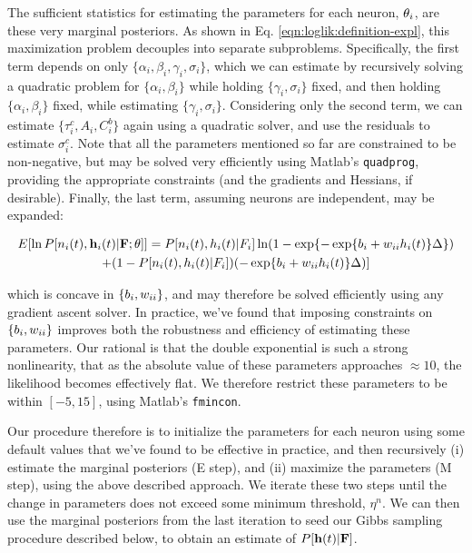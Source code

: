 The sufficient statistics for estimating the parameters for each neuron, $\mathbf{\theta}_i$, are these very marginal posteriors.  As shown in Eq. \eqref{eqn:loglik:definition-expl}, this maximization problem decouples into separate subproblems.  Specifically, the first term depends on only $\{\alpha_i, \beta_i, \gamma_i, \sigma_i\}$, which we can estimate by recursively solving a quadratic problem for $\{\alpha_i, \beta_i\}$ while holding $\{\gamma_i, \sigma_i\}$ fixed, and then holding $\{\alpha_i, \beta_i\}$ fixed, while estimating $\{\gamma_i,\sigma_i\}$.  Considering only the second term, we can estimate $\{\tau_i^c, A_i, C_i^b\}$ again using a quadratic solver, and use the residuals to estimate $\sigma_i^c$.  Note that all the parameters mentioned so far are constrained to be non-negative, but may be solved very efficiently using Matlab's \texttt{quadprog}, providing the appropriate constraints (and the gradients and Hessians, if desirable).  Finally, the last term, assuming neurons are independent,  may be expanded:

\begin{multline} \label{eqn:bw}
	E [\ln P[n_i(t), \mathbf{h}_i(t) | {\bf F}; \mathbf{\theta}]] = P[n_i(t), h_i(t) | F_i] \ln (1-\exp\{-\exp\{b_i + w_{ii} h_i(t)\}\Delta\})
	\\ +  (1-P[n_i(t), h_i(t) | F_i]) (-\exp\{b_i + w_{ii} h_i(t)\}\Delta)] 
\end{multline}

\noindent which is concave in $\{b_i, w_{ii}\}$, and may therefore be solved efficiently using any gradient ascent solver. In practice, we've found that imposing constraints on $\{b_i, w_{ii}\}$ improves both the robustness and efficiency of estimating these parameters.  Our rational is that the double exponential is such a strong nonlinearity, that as the absolute value of these parameters approaches $\approx 10$, the likelihood becomes effectively flat.  We therefore restrict these parameters to be within $[-5,15]$, using Matlab's \texttt{fmincon}.

Our procedure therefore is to initialize the parameters for each neuron using some default values that we've found to be effective in practice, and then recursively (i) estimate the marginal posteriors (E step), and (ii) maximize the parameters (M step), using the above described approach.  We iterate these two steps until the change in parameters does not exceed some minimum threshold, $\eta^n$.  We can then use the marginal posteriors from the last iteration to seed our Gibbs sampling procedure described below, to obtain an estimate of $P[\mathbf{h}(t) | {\bf F}]$.
